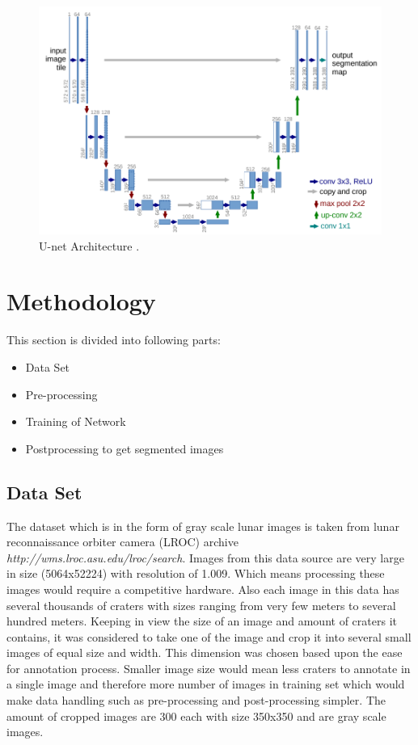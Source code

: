 \documentclass[11pt]{article}
\begin{document}
\begin{figure}[ht!]
	\centering
	\includegraphics[width=.7\linewidth]{files/unet/arch.png}
	\caption{U-net Architecture \cite{ronneberger2015u}.}
	\label{fig:U-net}
\end{figure} 

\section{Methodology}
This section is divided into following parts:

\begin{itemize}
 \item{Data Set}
 \item{Pre-processing}
 \item{Training of Network}
 \item{Postprocessing to get segmented images}
\end{itemize}

\subsection{Data Set}
The dataset which is in the form of gray scale lunar images is taken from lunar reconnaissance orbiter camera (LROC) archive \textit{http://wms.lroc.asu.edu/lroc/search}. Images from this data source are very large in size (5064x52224) with resolution of 1.009. Which means processing these images would require a competitive hardware. Also each image in this data has several thousands of craters with sizes ranging from very few meters to several hundred meters. Keeping in view the size of an image and amount of craters it contains, it was considered to take one of the image and crop it into several small images of equal size and width. This dimension was chosen based upon the ease for annotation process. Smaller image size would mean less craters to annotate in a single image and therefore more number of images in training set which would make data handling such as pre-processing and post-processing simpler. The amount of cropped images are 300 each with size 350x350 and are gray scale images.
\end{document}
